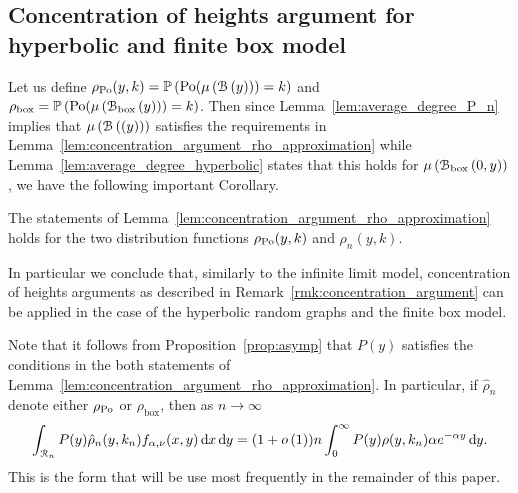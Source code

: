 \subsection{Concentration of heights argument for hyperbolic and finite box model}

Let us define $\rho_{{\mathrm{Po}}}(y,k) = \mathbb{P}\left({\mathrm{Po}}(\mu\left({\mathcal B}\left(y\right)\right)) = k\right)$ and $\rho_{\text{box}} = \mathbb{P}\left({\mathrm{Po}}(\mu\left({\mathcal B}_{\text{box}}\left(y\right)\right)) = k\right)$. Then since Lemma~\ref{lem:average_degree_P_n} implies that $\mu\left({\mathcal B}\left((y)\right)\right)$ satisfies the requirements in Lemma~\ref{lem:concentration_argument_rho_approximation} while Lemma~\ref{lem:average_degree_hyperbolic} states that this holds for $\mu\left({\mathcal B}_{\text{box}}\left(0,y\right)\right)$, we have the following important Corollary.

\begin{corollary}\label{cor:concentration_argument_other_models}
The statements of Lemma~\ref{lem:concentration_argument_rho_approximation} holds for the two distribution functions $\rho_{{\mathrm{Po}}}(y,k)$ and $\rho_{n}(y,k)$. 
\end{corollary}


In particular we conclude that, similarly to the infinite limit model, concentration of heights arguments as described in Remark~\ref{rmk:concentration_argument} can be applied in the case of the hyperbolic random graphs and the finite box model.

\begin{remark}
Note that it follows from Proposition~\ref{prop:asymp} that $P(y)$ satisfies the conditions in the both statements of Lemma~\ref{lem:concentration_argument_rho_approximation}. In particular, if $\hat{\rho}_n$ denote either $\rho_{{\mathrm{Po}}}$ or $\rho_{\text{box}}$, then as $n \to \infty$
\begin{equation}\label{eq:concentration_heights_argument_Py}
	\int_{{\mathcal R}_n} P(y) \hat{\rho}_n(y,k_n) f_{\alpha,\nu}(x, y) \operatorname{\mathrm{d}\hspace{-2pt}} x \operatorname{\mathrm{d}\hspace{-2pt}} y
	= (1 + o\left(1\right)) n \int_0^\infty P(y) \rho(y,k_n) \alpha e^{-\alpha y} \operatorname{\mathrm{d}\hspace{-2pt}} y.
\end{equation}
This is the form that will be use most frequently in the remainder of this paper.
\end{remark}


